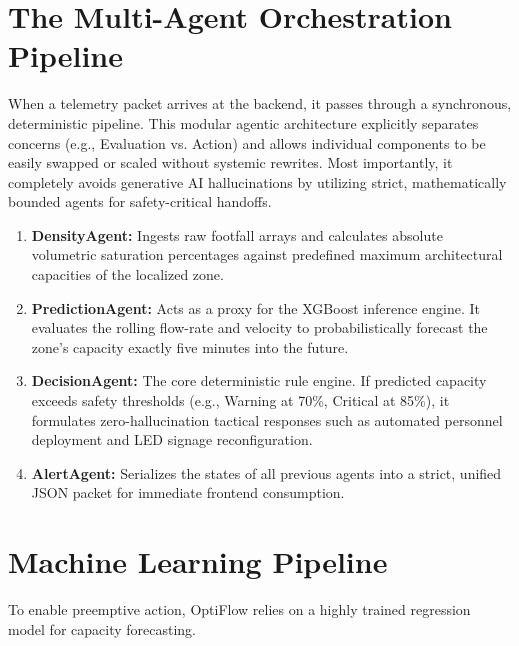 \documentclass[11pt, a4paper]{article}
\begin{document}
\section{The Multi-Agent Orchestration Pipeline}
When a telemetry packet arrives at the backend, it passes through a synchronous, deterministic pipeline. This modular agentic architecture explicitly separates concerns (e.g., Evaluation vs. Action) and allows individual components to be easily swapped or scaled without systemic rewrites. Most importantly, it completely avoids generative AI hallucinations by utilizing strict, mathematically bounded agents for safety-critical handoffs.

\begin{enumerate}[leftmargin=*]
    \item \textbf{DensityAgent:} Ingests raw footfall arrays and calculates absolute volumetric saturation percentages against predefined maximum architectural capacities of the localized zone.
    \item \textbf{PredictionAgent:} Acts as a proxy for the XGBoost inference engine. It evaluates the rolling flow-rate and velocity to probabilistically forecast the zone's capacity exactly five minutes into the future.
    \item \textbf{DecisionAgent:} The core deterministic rule engine. If predicted capacity exceeds safety thresholds (e.g., Warning at 70\%, Critical at 85\%), it formulates zero-hallucination tactical responses such as automated personnel deployment and LED signage reconfiguration.
    \item \textbf{AlertAgent:} Serializes the states of all previous agents into a strict, unified JSON packet for immediate frontend consumption.
\end{enumerate}

\section{Machine Learning Pipeline}
To enable preemptive action, OptiFlow relies on a highly trained regression model for capacity forecasting.
\end{document}
